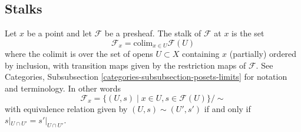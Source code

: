 \subsection{Stalks}
\label{subsection-stalks}

\noindent
Let $x$ be a point and let $\mathcal{F}$ be a presheaf.
The stalk of $\mathcal{F}$ at $x$ is the set
$$
\mathcal{F}_x
=
\text{colim}_{x\in U} \mathcal{F}(U)
$$
where the colimit is over the set of opens $U \subset X$
containing $x$ (partially) ordered by inclusion, with
transition maps given by the restriction maps of $\mathcal{F}$.
See Categories, Subsubsection \ref{categories-subsubsection-posets-limits}
for notation and terminology. In other words
$$
\mathcal{F}_x
=
\{
(U,s)
\mid
x\in U, s\in \mathcal{F}(U)
\}/\sim
$$
with equivalence relation given by $(U,s) \sim (U', s')$
if and only if $s|_{U\cap U'} = s'|_{U\cap U'}$.







